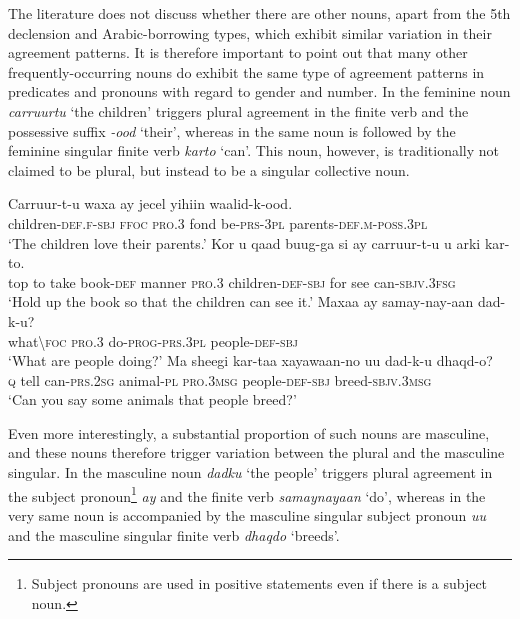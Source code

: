 \documentclass[output=paper]{langsci/langscibook}
\begin{document}
The literature does not discuss whether there are other nouns, apart from the 5th declension and Arabic-borrowing types, which exhibit similar variation in their agreement patterns. It is therefore important to point out that many other frequently-occurring nouns do exhibit the same type of agreement patterns in predicates and pronouns with regard to gender and number. In  the feminine noun \textit{carruurtu} ‘the children’ triggers plural agreement in the finite verb and the possessive suffix \textit{-ood} ‘their’, whereas in  the same noun is followed by the feminine singular finite verb \textit{karto} ‘can’. This noun, however, is traditionally not claimed to be plural, but instead to be a singular collective noun.

\ea\label{ex:nilsson:3}
\ea\label{ex:nilsson:3a}
\gll Carruur-t-u          waxa ay      jecel  yihiin           waalid-k-ood.\\
       children-\textsc{def.f-sbj} \textsc{ffoc} \textsc{pro.3} fond  be\textsc{-prs-3pl} parents-\textsc{def.m}-\textsc{poss.3pl}\\
\glt ‘The children love their parents.’
\ex\label{ex:nilsson:3b}
\gll Kor u qaad buug-ga  si          ay      carruur-t-u          u   arki kar-to.\\
     top to take book-\textsc{def} manner \textsc{pro.3} children-\textsc{def-sbj} for see can-\textsc{sbjv.3fsg}\\
\glt ‘Hold up the book so that the children can see it.’
\ex\label{ex:nilsson:3c}
\gll Maxaa     ay          samay-nay-aan     dad-k-u?\\
       what{\textbackslash}\textsc{foc} \textsc{pro.3}  do-\textsc{prog-prs.3pl}  people\textsc{-def-sbj}\\
\glt ‘What are people doing?’
\ex\label{ex:nilsson:3d}
\gll Ma sheegi kar-taa         xayawaan-no  uu        dad-k-u             dhaqd-o?\\
       \textsc{q}     tell     can-\textsc{prs.2sg} animal\textsc{-pl}  \textsc{pro.3msg}  people\textsc{-def-sbj} breed-\textsc{sbjv.3msg}\\
\glt ‘Can you say some animals that people breed?’
\z
\z

Even more interestingly, a substantial proportion of such nouns are masculine, and these nouns therefore trigger variation between the plural and the masculine singular. In  the masculine noun \textit{dadku} ‘the people’ triggers plural agreement in the subject pronoun\footnote{Subject pronouns are used in positive statements even if there is a subject noun.} \textit{ay} and the finite verb \textit{samaynayaan} ‘do’, whereas in  the very same noun is accompanied by the masculine singular subject pronoun \textit{uu} and the masculine singular finite verb \textit{dhaqdo} ‘breeds’. 
\end{document}
